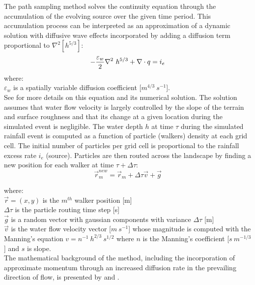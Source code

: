\documentclass[gmd, manuscript]{copernicus}
\begin{document}
\noindent
The path sampling method solves the continuity equation 
through the accumulation of the evolving source over the given time period. 
This accumulation process can be interpreted as
an approximation of a dynamic solution with diffusive wave effects
incorporated by adding a diffusion term proportional to
$ \nabla^2 [h^{5/3}]$:
\begin{equation}
\label{eq:difwater}
-{\varepsilon_w\over 2 }\nabla^2 ~ h^{5/3}
+\nabla \cdot \vec{q} = i_e
\end{equation}
{\small
\noindent
 where: \\
 \noindent
 \hspace*{0.5em} $\varepsilon_w$ is a spatially variable diffusion coefficient [$\unit{m}^{4/3}~\unit{s}^{-1}$]. \\
}
See \cite{Mitasova2004} for more details 
on this equation and its numerical solution.
The solution assumes that water flow velocity 
is largely controlled by the slope of the terrain and surface roughness 
and that its change at a given location during the simulated event is negligible. 
The water depth $h$ at time $\tau$ during the simulated rainfall event
 is computed as a function of particle (walkers) density at each grid cell. 
The initial number of particles per grid cell 
is proportional to the rainfall excess rate $i_e$ (source).
Particles are then routed across the landscape 
by finding a new position for each walker at time $\tau + \Delta \tau$:
\begin{equation}
\vec{r}_m^{new}=\vec{r}_m + \Delta \tau \vec{v} + \vec{g}
\end{equation}

{\small
\noindent
where: \\
\noindent
\hspace*{0.5em} $\vec{r} = (x, y)$ is the $m^{th}$ walker position [\unit{m}]\\
\hspace*{0.5em} $\Delta \tau$ is the particle routing time step [\unit{s}]\\
\hspace*{0.5em} $\vec{g}$ is a random vector with gaussian components with variance $\Delta \tau$ [\unit{m}]\\
\hspace*{0.5em} $\vec{v} $ is the water flow velocity vector [$\unit{m~s^{-1}}$]
whose magnitude is computed with the Manning's equation $v=n^{-1}~h^{2/3}~s^{1/2}$ 
where $n$ is the Manning's coefficient [$\unit{s~m^{-1/3}}$] and $s$ is slope.\\ 
}
%
\noindent
The mathematical background of the method,
including the incorporation of approximate momentum 
through an increased diffusion rate in the prevailing direction of flow,
is presented by \cite{Mitas1998} and \cite{Mitasova2004}.
\end{document}
